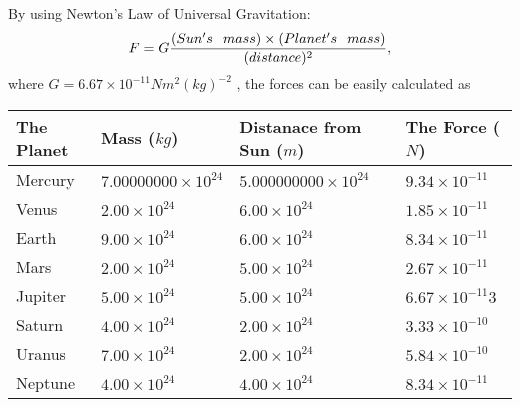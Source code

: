 \documentclass[12pt]{article}
\begin{document}
 
 
 
 
 
\noindent{}

By using Newton's Law of Universal Gravitation:
\[
F=G \frac{(Sun's \hspace{0.1in} mass) \times (Planet's \hspace{0.1in} mass)} { (distance)^2},
\]
where
$ G= %
6.67 \times 10^{-11} N m^{2}(kg)^{-2}$ , the forces can be easily calculated as
 
\vspace{0.2in}
 
 
\begin{tabular}{|l|l|l|l|}
\hline
The Planet & Mass ($kg$) & Distanace from Sun ($m$) & The Force ($N$)\\
\hline
Mercury  &
           $ %
7.00000000 \times 10^{24}  $   &
             $ %
5.000000000 \times 10^{24}$    & $ %
9.34 \times 10^{-11} $
\\  \hline
Venus    &
           $  %
2.00 \times 10^{24}  $     &
             $ %
6.00 \times 10^{24} $    & $ %
1.85 \times 10^{-11} $
\\  \hline
Earth    &
           $  %
9.00 \times 10^{24}$     &
             $ %
6.00 \times 10^{24} $    & $ %
8.34 \times 10^{-11} $
\\   \hline
Mars     &
           $  %
2.00 \times 10^{24} $     &
             $ %
5.00 \times 10^{24}$    & $ %
2.67 \times 10^{-11} $
\\   \hline
Jupiter  &
           $  %
5.00 \times 10^{24}  $    &
             $ %
5.00 \times 10^{24} $    & $ %
6.67 \times 10^{-11}3 $
\\  \hline
Saturn   &
           $  %
4.00 \times 10^{24}   $    &
             $ %
2.00 \times 10^{24}  $    & $ %
3.33 \times 10^{-10} $
\\  \hline
Uranus   &
           $  %
7.00 \times 10^{24} $    &
             $ %
2.00 \times 10^{24}$    & $ %
5.84 \times 10^{-10} $
\\  \hline
Neptune  &
           $  %
4.00 \times 10^{24}  $    &
             $ %
4.00 \times 10^{24} $    & $ %
8.34 \times 10^{-11} $
\\  \hline
 
\end{tabular}
 
 
 
 
  
\vspace{0.2in}
  
\end{document}
